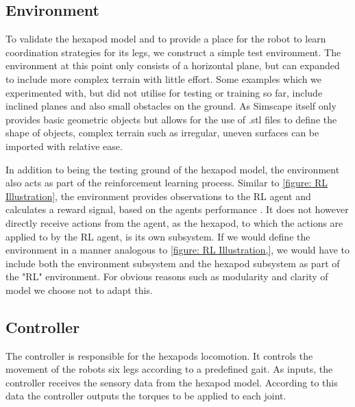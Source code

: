 

\subsection{Environment}
To validate the hexapod model and to provide a place for the robot to learn coordination strategies for its legs, we construct a simple test environment.
The environment at this point only consists of a horizontal plane, but can expanded to include more complex terrain with little effort.
Some examples which we experimented with, but did not utilise for testing or training so far, include inclined planes and also small obstacles on the ground.
As Simscape itself only provides basic geometric objects but allows for the use of .stl files to define the shape of objects, complex terrain such as irregular, uneven surfaces can be imported with relative ease.

In addition to being the testing ground of the hexapod model, the environment also acts as part of the reinforcement learning process.
Similar to \ref{figure: RL Illustration}, the environment provides observations to the RL agent and calculates a reward signal, based on the agents performance .
It does not however directly receive actions from the agent, as the hexapod, to which the actions are applied to by the RL agent, is its own subsystem.
If we would define the environment in a manner analogous to \ref{figure: RL Illustration,}, we would have to include both the environment subsystem and the hexapod subsystem as part of the "RL" environment.
For obvious reasons such as modularity and clarity of model we choose not to adapt this.

\subsection{Controller}
The controller is responsible for the hexapods locomotion.
It controls the movement of the robots six legs according to a predefined gait.
As inputs, the controller receives the sensory data from the hexapod model.
According to this data the controller outputs the torques to be applied to each joint.

